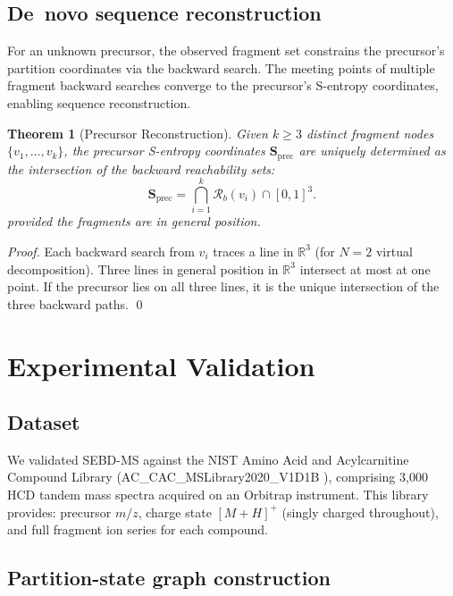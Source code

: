 \documentclass[twocolumn,10pt,a4paper]{article}
\theoremstyle{thmstyle}
\newtheorem{theorem}{Theorem}[section]
\theoremstyle{definition}
\theoremstyle{remark}
\newcommand{\R}{\mathbb{R}}
\newcommand{\Sv}{\mathbf{S}}
\newcommand{\Reachb}{\mathcal{R}_b}
\begin{document}
\subsection{De~novo sequence reconstruction}

For an unknown precursor, the observed fragment set constrains the
precursor's partition coordinates via the backward search. The meeting
points of multiple fragment backward searches converge to the precursor's
S-entropy coordinates, enabling sequence reconstruction.

\begin{theorem}[Precursor Reconstruction]
\label{thm:reconstruction}
Given $k \geq 3$ distinct fragment nodes $\{v_1, \ldots, v_k\}$, the
precursor S-entropy coordinates $\Sv_\text{prec}$ are uniquely determined
as the intersection of the backward reachability sets:
\begin{equation}
\Sv_\text{prec} = \bigcap_{i=1}^{k} \Reachb(v_i) \cap [0,1]^3.
\end{equation}
provided the fragments are in general position.
\end{theorem}

\begin{proof}
Each backward search from $v_i$ traces a line in $\R^3$ (for $N=2$
virtual decomposition). Three lines in general position in $\R^3$
intersect at most at one point. If the precursor lies on all three
lines, it is the unique intersection of the three backward paths.
\qed
\end{proof}

\section{Experimental Validation}
\label{sec:validation}

\subsection{Dataset}

We validated SEBD-MS against the NIST Amino Acid and Acylcarnitine
Compound Library (AC\_CAC\_MSLibrary2020\_V1D1B \citep{nist_acdac}),
comprising 3{,}000 HCD tandem mass spectra acquired on an Orbitrap
instrument. This library provides: precursor $m/z$, charge state
$[M+H]^+$ (singly charged throughout), and full fragment ion series
for each compound.

\subsection{Partition-state graph construction}
\end{document}
